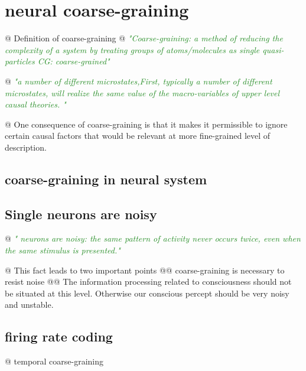 \documentclass[utf8]{article}
\newenvironment{ants}
			{
			 \begin{easylist}[itemize]
			}
			{
			\end{easylist}
			}
\newcommand{\rewrite}[1]{\textcolor{ForestGreen}{\textit{"#1"}}\newline}
\begin{document}
	\section{neural coarse-graining}
	
		\begin{ants}
			@ Definition of coarse-graining
				@ \rewrite{Coarse-graining: a method of reducing the complexity of a system by treating groups of atoms/molecules as single quasi-particles CG: coarse-grained}
				
				
				@ \rewrite{a number of different microstates,First, typically a number of different microstates, will realize the same value of the macro-variables of upper level causal theories. 
				}
			
			@ One consequence of coarse-graining is that it makes it permissible to ignore certain causal factors that would be relevant at more fine-grained level of description. \cite{price2007causation}
			
			
		\end{ants}
	
		\subsection{coarse-graining in neural system}
		\subsection{Single neurons are noisy}
		
			\begin{ants}
				@ \rewrite{
					neurons are noisy: the same pattern of activity never occurs twice, even when the same stimulus is presented.}
				
				@ This fact leads to two important points
					@@ coarse-graining is necessary to resist noise
					@@ The information processing related to consciousness should not be situated at this level. Otherwise our conscious percept should be very noisy and unstable.
								
			\end{ants}

		
		
		\subsection{firing rate coding}
		
			\begin{ants}
			
				@ temporal coarse-graining
				
			\end{ants}
		
\end{document}
